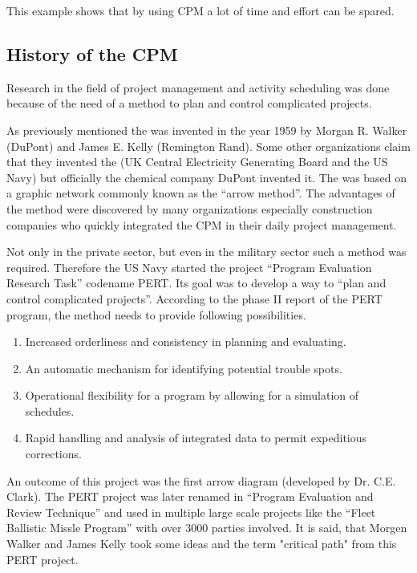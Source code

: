 This example shows that by using CPM a lot of time and effort can be spared. 

\subsection{History of the CPM}

Research in the field of project management and activity scheduling was done because of the need of
a method to plan and control complicated projects. 

As previously mentioned the \cpm{} was invented in the year 1959 by Morgan R. Walker
(DuPont) and James E. Kelly (Remington Rand).  Some other organizations claim that they invented the
\cpm{} (UK Central Electricity Generating Board and the US Navy) but officially the
chemical company DuPont invented it. The \cpm{} was based on a graphic network
commonly known as the “arrow method”.  The advantages of the \cpm{} method were discovered by
many organizations especially construction companies who quickly integrated the CPM in their daily
project management. 

Not only in the private sector, but even in the military sector such a method was required.
Therefore the US Navy started the project “Program Evaluation Research Task” codename PERT. Its goal
was to develop a way to “plan and control complicated projects”. According to the phase II report of
the PERT program, the method needs to provide following possibilities.

\begin{enumerate}
  \item Increased orderliness and consistency in planning and evaluating.
  \item An automatic mechanism for identifying potential trouble spots.
  \item Operational flexibility for a program by allowing for a simulation    of schedules.
  \item Rapid handling and analysis of integrated data to permit expeditious corrections.
\end{enumerate}

An outcome of this project was the first arrow diagram (developed by Dr. C.E. Clark). The PERT
project was later renamed in “Program Evaluation and Review Technique” and used in multiple large
scale projects like the “Fleet Ballistic Missle Program” with over 3000 parties involved. It is
said, that Morgen Walker and James Kelly took some ideas and the term "critical path" from this PERT
project\cite[p. 10]{obrien}.


